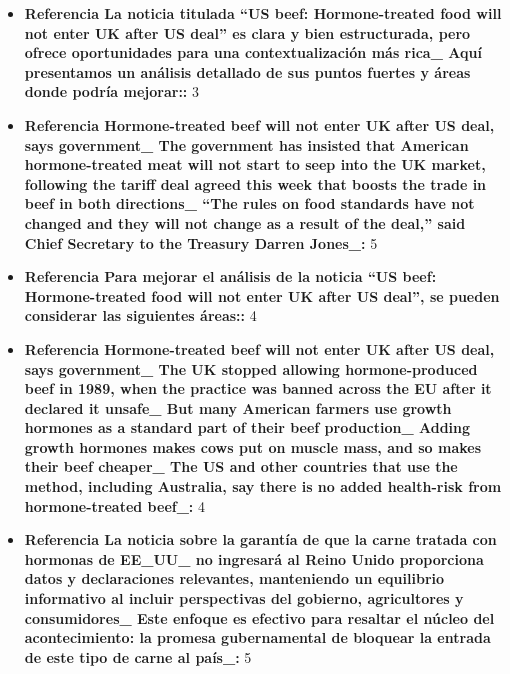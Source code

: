 \documentclass[10pt,a4paper]{article}
\begin{document}
\begin{itemize}[leftmargin=*]
            \item \textbf{Referencia La noticia titulada ``US beef: Hormone-treated food will not enter UK after US deal'' es clara y bien estructurada, pero ofrece oportunidades para una contextualizaci\'{o}n m\'{a}s rica\_ Aqu\'{i} presentamos un an\'{a}lisis detallado de sus puntos fuertes y \'{a}reas donde podr\'{i}a mejorar::} 3
            \item \textbf{Referencia Hormone-treated beef will not enter UK after US deal, says government\_ The government has insisted that American hormone-treated meat will not start to seep into the UK market, following the tariff deal agreed this week that boosts the trade in beef in both directions\_ ``The rules on food standards have not changed and they will not change as a result of the deal,'' said Chief Secretary to the Treasury Darren Jones\_:} 5
            \item \textbf{Referencia Para mejorar el an\'{a}lisis de la noticia ``US beef: Hormone-treated food will not enter UK after US deal'', se pueden considerar las siguientes \'{a}reas::} 4
            \item \textbf{Referencia Hormone-treated beef will not enter UK after US deal, says government\_ The UK stopped allowing hormone-produced beef in 1989, when the practice was banned across the EU after it declared it unsafe\_ But many American farmers use growth hormones as a standard part of their beef production\_ Adding growth hormones makes cows put on muscle mass, and so makes their beef cheaper\_ The US and other countries that use the method, including Australia, say there is no added health-risk from hormone-treated beef\_:} 4
            \item \textbf{Referencia La noticia sobre la garant\'{i}a de que la carne tratada con hormonas de EE\_UU\_ no ingresar\'{a} al Reino Unido proporciona datos y declaraciones relevantes, manteniendo un equilibrio informativo al incluir perspectivas del gobierno, agricultores y consumidores\_ Este enfoque es efectivo para resaltar el n\'{u}cleo del acontecimiento: la promesa gubernamental de bloquear la entrada de este tipo de carne al pa\'{i}s\_:} 5
    \end{itemize}
\vspace{1em}

\end{document}
